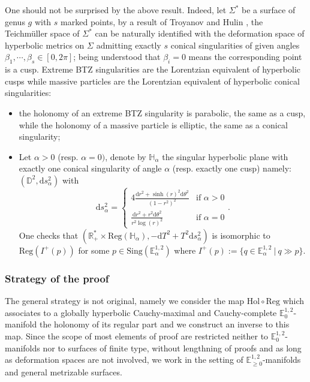 \documentclass[a4paper,12pt]{article}
\def\H{\mathbb{H}}
\def\d{\mathrm{d}}
\def\sing{\mathrm{Sing}}
\def\RR{\mathbb{R}}
\newcommand{\mass}[1]{{\mathbb E}^{1,2}_{#1}}
\def\Reg{\mathrm{Reg}}
\def\reg{\Reg}
\begin{document}
One should not be surprised by the above result.
Indeed, let $\Sigma^*$  be a surface of genus $g$ with $s$ marked points, by a result of Troyanov and Hulin \cite{MR1005085,MR1166122}, the Teichmüller space of $\Sigma^*$ can be naturally identified with the deformation space of hyperbolic metrics on $\Sigma$ admitting exactly $s$ conical singularities of given angles $\beta_1,\cdots,\beta_s \in [0,2\pi]$; being understood that $\beta_i=0$ means the corresponding point is a cusp. 
 Extreme BTZ singularities are the Lorentzian equivalent of hyperbolic cusps while massive particles are the Lorentzian equivalent of hyperbolic conical singularities: \begin{itemize}
 \item the holonomy of an extreme BTZ singularity is parabolic, the same as a cusp, while the holonomy of a massive particle is elliptic, the same as a conical singularity;
 \item Let $\alpha>0$ (resp. $\alpha=0)$, denote by $\H_\alpha$ the singular hyperbolic plane with exactly one conical singularity of angle $\alpha$ (resp. exactly one cusp) namely: 
  $(\mathbb D^2,\d s_ \alpha^2)$ with $$\d s_\alpha^2 = \left\{ \begin{matrix}4 \frac{\d r^2+\sinh(r)^2 \d \theta^2}{(1-r^2)^2}& \text{if } \alpha>0 \\ \frac{\d r^2+r^2\d \theta^2}{r^2\log(r)^2} 
  & \text{if } \alpha=0 \end{matrix}\right. .$$ One checks that 
 $(\RR_ +^*\times \reg(\H_\alpha)  , - \d T^2+ T^2 \d s_\alpha^2 ) $ is isomorphic to $\reg(I^+(p))$ for some $p\in \sing(\mass{\alpha})$ where $I^+(p):=\{q\in \mass{\alpha} ~|~ q\gg p\}$.
 
\end{itemize}  


\subsubsection*{Strategy of the proof}

The general strategy is not original, namely we consider the map $\mathrm{Hol} \circ \reg$ which associates to a  globally hyperbolic Cauchy-maximal and Cauchy-com\-plete $\mass{0}$-manifold the holonomy of its regular part and we construct an inverse to this map. Since the scope of most elements of proof  are  restricted neither to $\mass{0}$-manifolds nor to surfaces of finite type, without lengthning of proofs and as long as deformation spaces are not involved, we work in the setting of $\mass{\geq0}$-manifolds and general metrizable surfaces.
\end{document}
